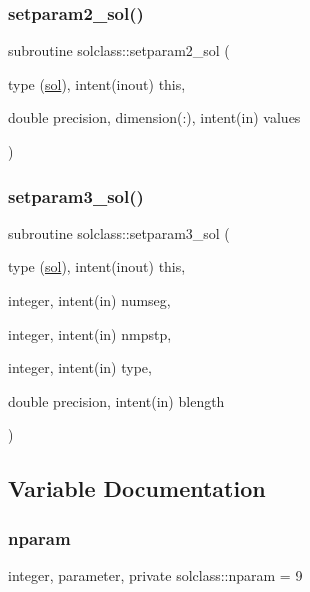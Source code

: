 \subsubsection{\texorpdfstring{setparam2\_sol()}{setparam2\_sol()}}
{\footnotesize\ttfamily subroutine solclass\+::setparam2\+\_\+sol (\begin{DoxyParamCaption}\item[{type (\mbox{\hyperlink{namespacesolclass_structsolclass_1_1sol}{sol}}), intent(inout)}]{this,  }\item[{double precision, dimension(\+:), intent(in)}]{values }\end{DoxyParamCaption})}

\mbox{\label{namespacesolclass_a05dc05d4a94a2e1a71280ff983e62c3e}} 
\subsubsection{\texorpdfstring{setparam3\_sol()}{setparam3\_sol()}}
{\footnotesize\ttfamily subroutine solclass\+::setparam3\+\_\+sol (\begin{DoxyParamCaption}\item[{type (\mbox{\hyperlink{namespacesolclass_structsolclass_1_1sol}{sol}}), intent(inout)}]{this,  }\item[{integer, intent(in)}]{numseg,  }\item[{integer, intent(in)}]{nmpstp,  }\item[{integer, intent(in)}]{type,  }\item[{double precision, intent(in)}]{blength }\end{DoxyParamCaption})}



\subsection{Variable Documentation}
\mbox{\label{namespacesolclass_abb5af39a08a5ff2cbe713621b2727eaf}} 
\subsubsection{\texorpdfstring{nparam}{nparam}}
{\footnotesize\ttfamily integer, parameter, private solclass\+::nparam = 9\hspace{0.3cm}{\ttfamily [private]}}


